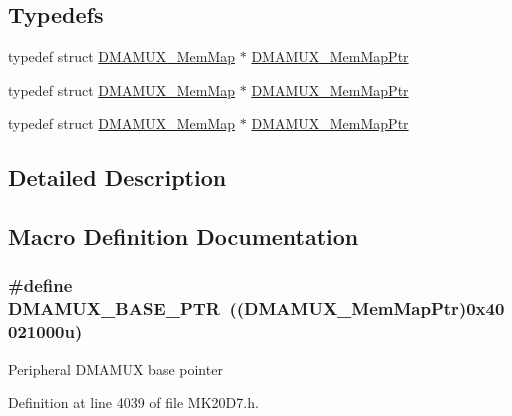 \subsection*{Typedefs}
\begin{DoxyCompactItemize}
\item 
typedef struct \hyperlink{struct_d_m_a_m_u_x___mem_map}{D\+M\+A\+M\+U\+X\+\_\+\+Mem\+Map} $\ast$ \hyperlink{group___d_m_a_m_u_x___peripheral_ga736ab5b1ed284b3b4fdb63010a576777}{D\+M\+A\+M\+U\+X\+\_\+\+Mem\+Map\+Ptr}
\item 
typedef struct \hyperlink{struct_d_m_a_m_u_x___mem_map}{D\+M\+A\+M\+U\+X\+\_\+\+Mem\+Map} $\ast$ \hyperlink{group___d_m_a_m_u_x___peripheral_ga736ab5b1ed284b3b4fdb63010a576777}{D\+M\+A\+M\+U\+X\+\_\+\+Mem\+Map\+Ptr}
\item 
typedef struct \hyperlink{struct_d_m_a_m_u_x___mem_map}{D\+M\+A\+M\+U\+X\+\_\+\+Mem\+Map} $\ast$ \hyperlink{group___d_m_a_m_u_x___peripheral_ga736ab5b1ed284b3b4fdb63010a576777}{D\+M\+A\+M\+U\+X\+\_\+\+Mem\+Map\+Ptr}
\end{DoxyCompactItemize}


\subsection{Detailed Description}


\subsection{Macro Definition Documentation}
\subsubsection[{\texorpdfstring{D\+M\+A\+M\+U\+X\+\_\+\+B\+A\+S\+E\+\_\+\+P\+TR}{DMAMUX_BASE_PTR}}]{\setlength{\rightskip}{0pt plus 5cm}\#define D\+M\+A\+M\+U\+X\+\_\+\+B\+A\+S\+E\+\_\+\+P\+TR~(({\bf D\+M\+A\+M\+U\+X\+\_\+\+Mem\+Map\+Ptr})0x40021000u)}\hypertarget{group___d_m_a_m_u_x___peripheral_gad38c261e5de04658dbad762d40e8904e}{}\label{group___d_m_a_m_u_x___peripheral_gad38c261e5de04658dbad762d40e8904e}
Peripheral D\+M\+A\+M\+UX base pointer 

Definition at line 4039 of file M\+K20\+D7.\+h.

